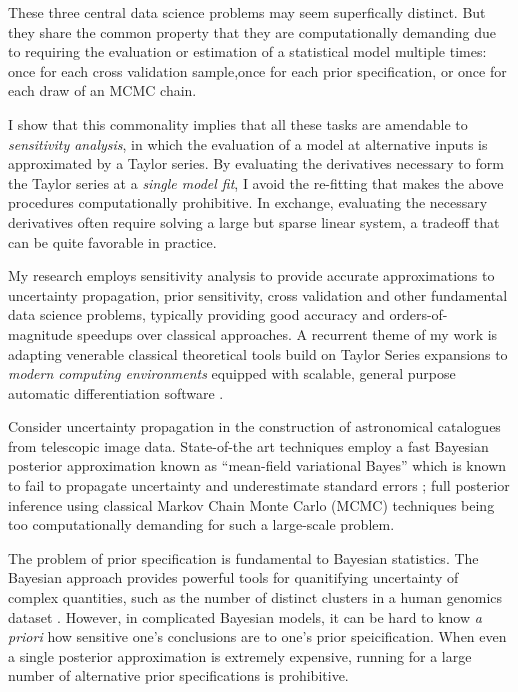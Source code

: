 These three central data science problems may seem superfically distinct.  But
they share the common property that they are computationally demanding due to
requiring the evaluation or estimation of a statistical model multiple times:
once for each cross validation sample,once for each prior specification, or
once for each draw of an MCMC chain.

I show that this commonality implies that all these tasks are amendable to {\em
sensitivity analysis}, in which the evaluation of a model at alternative inputs
is approximated by a Taylor series.  By evaluating the derivatives necessary to
form the Taylor series at a {\em single model fit}, I avoid the re-fitting that
makes the above procedures computationally prohibitive.  In exchange, evaluating
the necessary derivatives often require solving a large but sparse linear
system, a tradeoff that can be quite favorable in practice.





\newpage

My research employs sensitivity analysis to provide accurate approximations to
uncertainty propagation, prior sensitivity, cross validation and other
fundamental data science problems, typically providing good accuracy and
orders-of-magnitude speedups over classical approaches.  A recurrent theme of my
work is adapting venerable classical theoretical tools build on Taylor Series
expansions  \citep{reeds:1976:thesis, gustafson:1996:localposterior,
opper:2001:advancedmeanfield} to {\em modern computing environments} equipped
with scalable, general purpose automatic differentiation software
\citep{baydin:2015:automatic, carpenter:2015:stanmath}.




Consider uncertainty propagation in the construction of astronomical catalogues
from telescopic image data. State-of-the art techniques employ a fast Bayesian
posterior approximation known as ``mean-field variational Bayes''
\citep{regier:2019:cataloging} which is known to fail to propagate uncertainty
and underestimate standard errors \citep{turner:2011:two}; full posterior
inference using classical Markov Chain Monte Carlo (MCMC) techniques being too
computationally demanding for such a large-scale problem.

The problem of prior specification is fundamental to Bayesian statistics. The
Bayesian approach provides powerful tools for quanitifying uncertainty of
complex quantities, such as the number of distinct clusters in a human genomics
dataset \citep{huang:2011:haplotype, raj:2014:faststructure}.  However, in
complicated Bayesian models, it can be hard to know {\em a priori} how sensitive
one's conclusions are to one's prior speicification.  When even a single
posterior approximation is extremely expensive, running for a large number of
alternative prior specifications is prohibitive.

